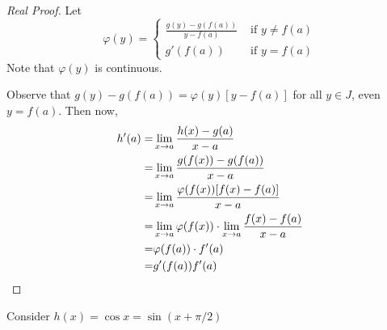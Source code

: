 \begin{proof}[Real Proof]
    Let \begin{equation*}
        \varphi(y) = \begin{cases}
            \frac{g(y) - g(f(a))}{y-f(a)} & \text{ if } y\neq f(a)\\
            g'(f(a)) &\text{ if } y=f(a)
        \end{cases}
    \end{equation*}
    Note that $\varphi (y)$ is continuous.
    
    Observe that $g(y) - g(f(a)) = \varphi (y) [y-f(a)]$ for all $y \in J$, even $y=f(a)$. Then now,
     \begin{align*}
    h'(a) = & \lim_{x\to a} \frac{h(x) - g(a)}{x-a} \\
    = & \lim_{x\to a } \frac{g(f(x)) - g(f(a))}{ x-a} \\
    = & \lim_{x\to a} \frac{\varphi (f(x)) [f(x) - f(a)]}{x-a}\\
    = & \lim_{x \to a} \varphi (f(x)) \cdot \lim_{x \to a} \frac{f(x) - f(a)}{x-a}\\
    = & \varphi (f(a)) \cdot f'(a)\\
    = & g'(f(a))f'(a) \qedhere
    \end{align*}
\end{proof}

\begin{exmp}
Consider $h(x) = \cos x = \sin (x + \pi / 2)$
\end{exmp}